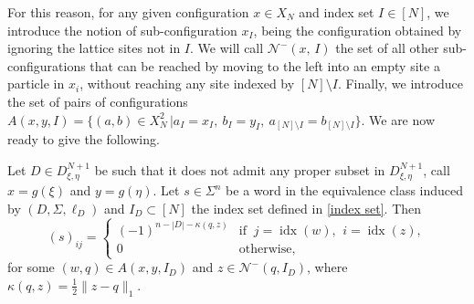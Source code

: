 \documentclass{article}
\begin{document}
For this reason, for any given configuration $x\in X_N$ and index set $I\in[N]$, we introduce the notion of sub-configuration $x_I$, being the configuration obtained by ignoring the lattice sites not in $I$. We will call $\mathcal{N}^-(x,\,I)$  the set of all other sub-configurations that can be reached by moving to the left into an empty site a particle in $x_i$, without reaching any site indexed by $[N]\setminus I$. 
Finally, we introduce the set of pairs of configurations $A(x,y,I)=\big\{(a,b)\in X_N^2\,\big|a_I=x_I, \ b_I=y_I, \ a_{[N]\setminus I}=b_{[N]\setminus I}\big\}$. We are now ready to give the following.
\begin{lemma}
    Let $D\in D^{N+1}_{\xi,\eta}$ be such that it does not admit any proper subset in $ D^{N+1}_{\xi,\eta}$, call
    $x=g(\xi)$ and $y=g(\eta)$.
    Let $s\in\Sigma^n$ be a word in the equivalence class induced by $(D,\Sigma,\ell_D)$ and $I_D\subset [N]$ the index set defined in \eqref{index set}.
    Then
    \[
    (s)_{ij}=
    \begin{cases}
    (-1)^{n-|D|-\kappa(q,z)}
    & \text{if } \ j=\operatorname{idx}(w) \text{, } \ i=\operatorname{idx}(z),\\
    0 & \text{otherwise},
    \end{cases}
    \]
for some $(w,q)\in A(x,y,I_D)$ and  $z\in \mathcal{N}^-(q,I_D)$, where  $\kappa(q,z)=\frac12\|z-q\|_1$. 
\end{lemma}
\end{document}
